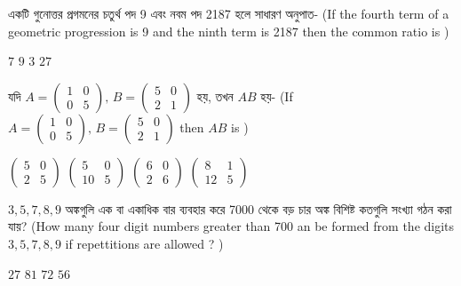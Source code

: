 \documentclass[addpoints]{exam}
\begin{document}
\begin{questions}
\question একটি গুনোত্তর প্রগমনের চতুর্থ পদ 9 এবং নবম পদ 2187 হলে সাধারণ অনুপাত- (If the fourth term of a geometric progression is 9 and the ninth term is 2187 then the common ratio is )

\begin{oneparchoices}
\choice $ 7 $
\choice $ 9 $
\choice  $ 3 $
\choice $ 27 $
\end{oneparchoices}

 \question যদি $ A= \begin{pmatrix}
 1 & 0\\
 0 & 5
\end{pmatrix},\, B =\begin{pmatrix}
 5 & 0\\
 2 & 1
\end{pmatrix}   $ হয়, তখন $ AB $ হয়- (If $ A= \begin{pmatrix}
 1 & 0\\
 0 & 5
\end{pmatrix},\, B =\begin{pmatrix}
 5 & 0\\
 2 & 1
\end{pmatrix}   $ then $ AB $ is ) 

\begin{oneparchoices}
\choice $ \begin{pmatrix}
 5 & 0\\
 2 & 5
\end{pmatrix} $
\choice $ \begin{pmatrix}
 5 & 0\\
 10 & 5
\end{pmatrix} $
\choice $ \begin{pmatrix}
 6 & 0\\
 2 & 6
\end{pmatrix} $
\choice $ \begin{pmatrix}
 8 & 1\\
 12 & 5
\end{pmatrix} $
\end{oneparchoices}

\question $ 3,5,7,8,9 $ অঙ্কগুলি এক বা একাধিক বার ব্যবহার করে 7000 থেকে বড় চার অঙ্ক বিশিষ্ট কতগুলি সংখ্যা গঠন করা যায়? (How many four digit numbers greater than 700 an be formed from the digits $ 3,5,7,8,9 $ if repettitions are allowed ? ) 

\begin{oneparchoices}
\choice $ 27 $
\choice $ 81 $
\choice $ 72 $
\choice $ 56 $
\end{oneparchoices}


\end{questions}
\end{document}
